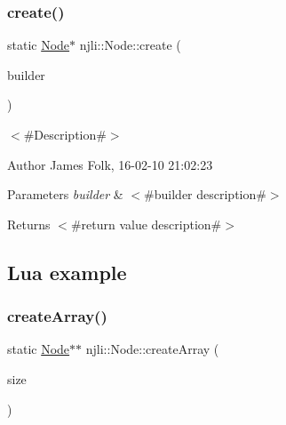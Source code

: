 \begin{DoxyCodeInclude}
\end{DoxyCodeInclude}
\mbox{\label{classnjli_1_1_node_a55a31dd7ce89a76fe6620b3deb984bbb}} 
\subsubsection{\texorpdfstring{create()}{create()}\hspace{0.1cm}{\footnotesize\ttfamily [3/3]}}
{\footnotesize\ttfamily static \mbox{\hyperlink{classnjli_1_1_node}{Node}}$\ast$ njli\+::\+Node\+::create (\begin{DoxyParamCaption}\item[{const \mbox{\hyperlink{classnjli_1_1_node_builder}{Node\+Builder}} \&}]{builder }\end{DoxyParamCaption})\hspace{0.3cm}{\ttfamily [static]}}



$<$\#\+Description\#$>$ 

\begin{DoxyAuthor}{Author}
James Folk, 16-\/02-\/10 21\+:02\+:23
\end{DoxyAuthor}

\begin{DoxyParams}{Parameters}
{\em builder} & $<$\#builder description\#$>$\\
\hline
\end{DoxyParams}
\begin{DoxyReturn}{Returns}
$<$\#return value description\#$>$
\end{DoxyReturn}
\hypertarget{classnjli_1_1_steering_behavior_wander_ex1}{}\subsection{Lua example}\label{classnjli_1_1_steering_behavior_wander_ex1}

\begin{DoxyCodeInclude}
\end{DoxyCodeInclude}
\mbox{\label{classnjli_1_1_node_a84cb417cae539076d9ee123c8d59a7bf}} 
\subsubsection{\texorpdfstring{create\+Array()}{createArray()}}
{\footnotesize\ttfamily static \mbox{\hyperlink{classnjli_1_1_node}{Node}}$\ast$$\ast$ njli\+::\+Node\+::create\+Array (\begin{DoxyParamCaption}\item[{const \mbox{\hyperlink{_util_8h_a10e94b422ef0c20dcdec20d31a1f5049}{u32}}}]{size }\end{DoxyParamCaption})\hspace{0.3cm}{\ttfamily [static]}}



